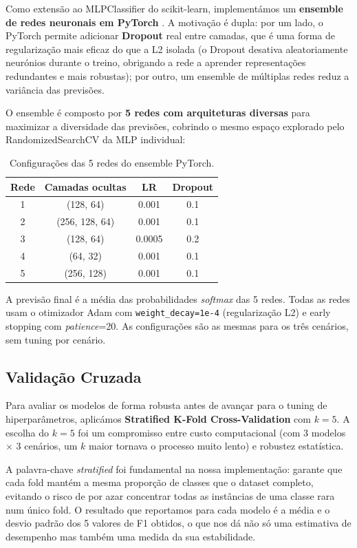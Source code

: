 \documentclass[12pt,a4paper]{article}
\begin{document}
Como extensão ao MLPClassifier do scikit-learn, implementámos um \textbf{ensemble de redes
neuronais em PyTorch} \cite{paszke2019}. A motivação é dupla: por um lado, o PyTorch permite
adicionar \textbf{Dropout} real entre camadas, que é uma forma de regularização mais eficaz
do que a L2 isolada (o Dropout desativa aleatoriamente neurónios durante o treino, obrigando
a rede a aprender representações redundantes e mais robustas); por outro, um ensemble de
múltiplas redes reduz a variância das previsões.

O ensemble é composto por \textbf{5 redes com arquiteturas diversas} para maximizar a
diversidade das previsões, cobrindo o mesmo espaço explorado pelo RandomizedSearchCV
da MLP individual:

\begin{table}[H]
\centering
\caption{Configurações das 5 redes do ensemble PyTorch.}
\begin{tabular}{cccc}
\toprule
\textbf{Rede} & \textbf{Camadas ocultas} & \textbf{LR} & \textbf{Dropout} \\
\midrule
1 & (128, 64)       & 0.001 & 0.1 \\
2 & (256, 128, 64)  & 0.001 & 0.1 \\
3 & (128, 64)       & 0.0005 & 0.2 \\
4 & (64, 32)        & 0.001 & 0.1 \\
5 & (256, 128)      & 0.001 & 0.1 \\
\bottomrule
\end{tabular}
\end{table}

A previsão final é a média das probabilidades \textit{softmax} das 5 redes. Todas as redes
usam o otimizador Adam com \texttt{weight\_decay=1e-4} (regularização L2) e early stopping
com \textit{patience}=20. As configurações são as mesmas para os três cenários, sem tuning
por cenário.

\subsection{Validação Cruzada}

Para avaliar os modelos de forma robusta antes de avançar para o tuning de hiperparâmetros,
aplicámos \textbf{Stratified K-Fold Cross-Validation} com $k=5$. A escolha do $k=5$ foi
um compromisso entre custo computacional (com 3 modelos $\times$ 3 cenários, um $k$ maior
tornava o processo muito lento) e robustez estatística.

A palavra-chave \textit{stratified} foi fundamental na nossa implementação: garante que
cada fold mantém a mesma proporção de classes que o dataset completo, evitando o risco de
por azar concentrar todas as instâncias de uma classe rara num único fold. O resultado que
reportamos para cada modelo é a média e o desvio padrão dos 5 valores de F1 obtidos, o
que nos dá não só uma estimativa de desempenho mas também uma medida da sua estabilidade.
\end{document}
